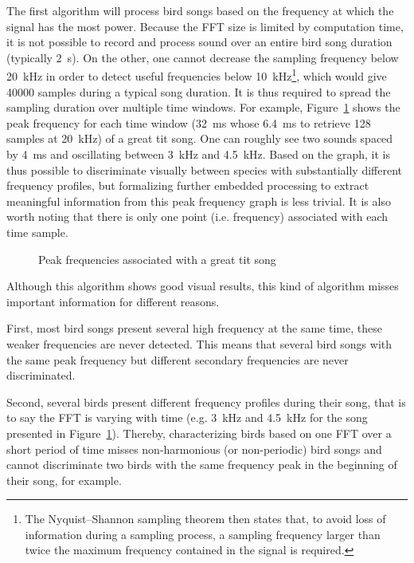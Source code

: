 \documentclass{EPL-master-thesis-covers-EN}
\begin{document}
The first algorithm will process bird songs based on the frequency at which the signal has the most power. Because the FFT size is limited by computation time, it is not possible to record and process sound over an entire bird song duration (typically \SI{2}{s}). On the other, one cannot decrease the sampling frequency below \SI{20}{kHz} in order to detect useful frequencies below \SI{10}{kHz}\footnote{The Nyquist–Shannon sampling theorem then states that, to avoid loss of information during a sampling process, a sampling frequency larger than twice the maximum frequency contained in the signal is required.}, which would give \SI{40000}{} samples during a typical song duration. It is thus required to spread the sampling duration over multiple time windows. For example, Figure~\ref{fig:peak_frequency} shows the peak frequency for each time window (\SI{32}{ms} whose \SI{6.4}{ms} to retrieve 128 samples at \SI{20}{kHz}) of a great tit song. One can roughly see two sounds spaced by \SI{4}{ms} and oscillating between \SI{3}{kHz} and \SI{4.5}{kHz}. Based on the graph, it is thus possible to discriminate visually between species with substantially different frequency profiles, but formalizing further embedded processing to extract meaningful information from this peak frequency graph is less trivial. It is also worth noting that there is only one point (i.e. frequency) associated with each time sample.

\begin{figure}[H]
    \centering
    
    \caption{Peak frequencies associated with a great tit song}
    \label{fig:peak_frequency}
\end{figure}

Although this algorithm shows good visual results, this kind of algorithm misses important information for different reasons.

First, most bird songs present several high frequency at the same time, these weaker frequencies are never detected. This means that several bird songs with the same peak frequency but different secondary frequencies are never discriminated.

Second, several birds present different frequency profiles during their song, that is to say the FFT is varying with time (e.g. \SI{3}{kHz} and \SI{4.5}{kHz} for the song presented in Figure~\ref{fig:peak_frequency}). Thereby, characterizing birds based on one FFT over a short period of time misses non-harmonious (or non-periodic) bird songs and cannot discriminate two birds with the same frequency peak in the beginning of their song, for example.
\end{document}
